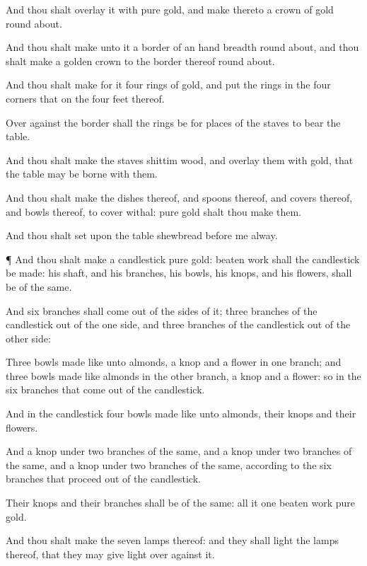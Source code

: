 {And thou shalt
overlay it with
pure
gold, and
make thereto a
crown of
gold round
about.

And thou shalt
make unto it a
border of an hand
breadth round
about, and thou shalt
make a
golden
crown to the
border thereof round
about.

And thou shalt
make for it
four
rings of
gold, and
put the
rings in the
four
corners that
{} on the
four
feet thereof.

Over
against the
border shall the
rings be for
places of the
staves to
bear the
table.

And thou shalt
make the
staves
{}
shittim
wood, and
overlay them with
gold, that the
table may be
borne with them.

And thou shalt
make the
dishes thereof, and
spoons thereof, and
covers thereof, and
bowls thereof, to
cover
withal:
{}
pure
gold shalt thou
make them.

And thou shalt
set upon the
table
shewbread
before me
alway.


\par }{\PP {}¶ And thou shalt
make a
candlestick
{}
pure
gold:
{} beaten
work shall the
candlestick be
made: his
shaft, and his
branches, his
bowls, his
knops, and his
flowers, shall be of the same.

And
six
branches shall
come out of the
sides of it;
three
branches of the
candlestick out of the
one
side, and
three
branches of the
candlestick out of the
other
side:

Three
bowls made like unto
almonds,
{} a
knop and a
flower in
one
branch; and
three
bowls made like
almonds in the
other
branch,
{} a
knop and a
flower: so in the
six
branches that
come out of the
candlestick.

And in the
candlestick
{}
four
bowls made like unto
almonds,
{} their
knops and their
flowers.

And
{} a
knop under
two
branches of the same, and a
knop under
two
branches of the same, and a
knop under
two
branches of the same, according to the
six
branches that
proceed out of the
candlestick.

Their
knops and their
branches shall be of the same: all it
{}
one beaten
work
{}
pure
gold.

And thou shalt
make the
seven
lamps thereof: and they shall
light the
lamps thereof, that they may give
light over
against
it.

}
